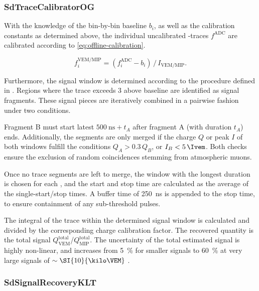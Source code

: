 \subsubsection{SdTraceCalibratorOG}
\label{sssec:reconstruction-trace-calibrator}

With the knowledge of the bin-by-bin baseline $b_i$, as well as the calibration
constants as determined above, the individual uncalibrated \PMT-traces 
$f^\mathrm{ADC}$ are calibrated according to \cref{eq:offline-calibration}.

\begin{equation}
\label{eq:offline-calibration}
f^\mathrm{VEM/MIP}_i = \left( f^\mathrm{ADC}_i - b_i \right)\,/\,I_\mathrm{VEM/MIP}.
\end{equation}

Furthermore, the signal window is determined according to the procedure defined
in \cite[Sec. 3.3 of][]{aabReconstructionEventsRecorded2020}. Regions where the
trace exceeds \SI{3}{\ADC} above baseline are identified as signal fragments. 
These signal pieces are iteratively combined in a pairwise fashion under two 
conditions. 

Fragment B must start latest $\SI{500}{\nano\second} + t_A$ after fragment A 
(with duration $t_A$) ends. Additionally, the segments are only merged if the 
charge $Q$ or peak $I$ of both windows fulfill the conditions $Q_A > 0.3\,Q_B$,
or $I_B < 5\,\Ivem$. Both checks ensure the exclusion of random coincidences 
stemming from atmospheric muons.

Once no trace segments are left to merge, the window with the longest duration
is chosen for each \WCD \PMT, and the \EAS start and stop time are calculated 
as the average of the single-\PMT start/stop times. A buffer time of 
\SI{250}{\nano\second} is appended to the stop time, to ensure containment of 
any sub-threshold pulses. 

The integral of the \FADC trace within the determined signal window is 
calculated and divided by the corresponding charge calibration factor. The 
recovered quantity is the total \EAS signal 
$Q^\mathrm{total}_\mathrm{VEM}$/$Q^\mathrm{total}_\mathrm{MIP}$. The 
uncertainty of the total estimated signal is highly non-linear, and increases 
from \SI{5}{\percent} for smaller signals to \SI{60}{\percent} at very large 
signals of $\sim\SI{10}{\kilo\VEM}$ \cite{aabReconstructionEventsRecorded2020}.

\subsubsection{SdSignalRecoveryKLT}
\label{sssec:reconstruction-signal-recovery}

